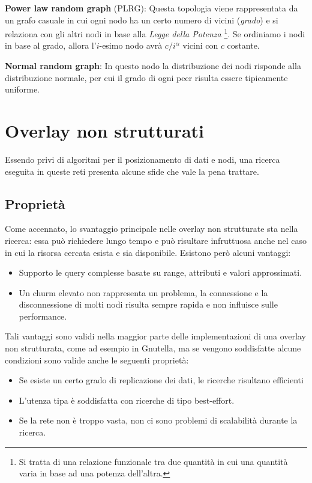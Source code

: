 \textbf{Power law random graph} (PLRG): Questa topologia viene
rappresentata da un grafo casuale in cui ogni nodo ha un certo numero di
vicini (\emph{grado}) e si relaziona con gli altri nodi in base alla
\emph{Legge della Potenza} \footnote{Si tratta di una relazione
  funzionale tra due quantità in cui una quantità varia in base ad una
  potenza dell'altra.}. Se ordiniamo i nodi in base al grado, allora
l'$i$-esimo nodo avrà $c/i^\alpha$ vicini con $c$ costante.

\textbf{Normal random graph}: In questo nodo la distribuzione dei nodi
risponde alla distribuzione normale, per cui il grado di ogni peer
risulta essere tipicamente uniforme.

\section{Overlay non strutturati}\label{overlay-non-strutturati}

Essendo privi di algoritmi per il posizionamento di dati e nodi, una
ricerca eseguita in queste reti presenta alcune sfide che vale la pena
trattare.

\subsection{Proprietà}\label{proprietuxe0}

Come accennato, lo svantaggio principale nelle overlay non strutturate
sta nella ricerca: essa può richiedere lungo tempo e può risultare
infruttuosa anche nel caso in cui la risorsa cercata esista e sia
disponibile. Esistono però alcuni vantaggi:

\begin{itemize}
\itemsep1pt\parskip0pt
\item
  Supporto le query complesse basate su range, attributi e valori
  approssimati.
\item
  Un churm elevato non rappresenta un problema, la connessione e la
  disconnessione di molti nodi risulta sempre rapida e non influisce
  sulle performance.
\end{itemize}

Tali vantaggi sono validi nella maggior parte delle implementazioni di
una overlay non strutturata, come ad esempio in Gnutella, ma se vengono
soddisfatte alcune condizioni sono valide anche le seguenti proprietà:

\begin{itemize}
\itemsep1pt\parskip0pt
\item
  Se esiste un certo grado di replicazione dei dati, le ricerche
  risultano efficienti
\item
  L'utenza tipa è soddisfatta con ricerche di tipo best-effort.
\item
  Se la rete non è troppo vasta, non ci sono problemi di scalabilità
  durante la ricerca.
\end{itemize}

